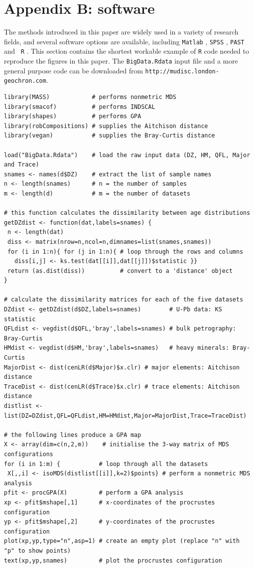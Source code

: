 \documentclass{article}
\begin{document}
\section*{Appendix B: software}

The methods introduced in this paper are widely used in a variety of
research fields, and several software options are available, including
{\tt Matlab} \citep{trendafilov2012}, {\tt SPSS} \citep[{\tt
    PROXSCAL},][]{busing1997}, {\tt PAST} \citep{hammer2008} and {\tt
  R} \citep{deleeuw2011}. This section contains the shortest workable
example of {\tt R} code needed to reproduce the figures in this paper.
The {\tt BigData.Rdata} input file and a more general purpose code can
be downloaded from \verb|http://mudisc.london-geochron.com|.

\begin{verbatim}
library(MASS)            # performs nonmetric MDS
library(smacof)          # performs INDSCAL
library(shapes)          # performs GPA
library(robCompositions) # supplies the Aitchison distance
library(vegan)           # supplies the Bray-Curtis distance

load("BigData.Rdata")    # load the raw input data (DZ, HM, QFL, Major and Trace)
snames <- names(d$DZ)    # extract the list of sample names
n <- length(snames)      # n = the number of samples
m <- length(d)           # m = the number of datasets

# this function calculates the dissimilarity between age distributions
getDZdist <- function(dat,labels=snames) { 
 n <- length(dat)
 diss <- matrix(nrow=n,ncol=n,dimnames=list(snames,snames))
 for (i in 1:n){ for (j in 1:n){ # loop through the rows and columns
   diss[i,j] <- ks.test(dat[[i]],dat[[j]])$statistic }}
 return (as.dist(diss))          # convert to a 'distance' object
}

# calculate the dissimilarity matrices for each of the five datasets
DZdist <- getDZdist(d$DZ,labels=snames)        # U-Pb data: KS statistic
QFLdist <- vegdist(d$QFL,'bray',labels=snames) # bulk petrography: Bray-Curtis
HMdist <- vegdist(d$HM,'bray',labels=snames)   # heavy minerals: Bray-Curtis
MajorDist <- dist(cenLR(d$Major)$x.clr) # major elements: Aitchison distance
TraceDist <- dist(cenLR(d$Trace)$x.clr) # trace elements: Aitchison distance
distlist <- list(DZ=DZdist,QFL=QFLdist,HM=HMdist,Major=MajorDist,Trace=TraceDist)

# the following lines produce a GPA map
X <- array(dim=c(n,2,m))    # initialise the 3-way matrix of MDS configurations
for (i in 1:m) {           # loop through all the datasets
 X[,,i] <- isoMDS(distlist[[i]],k=2)$points} # perform a nonmetric MDS analysis
pfit <- procGPA(X)         # perform a GPA analysis
xp <- pfit$mshape[,1]      # x-coordinates of the procrustes configuration
yp <- pfit$mshape[,2]      # y-coordinates of the procrustes configuration
plot(xp,yp,type="n",asp=1) # create an empty plot (replace "n" with "p" to show points)
text(xp,yp,snames)         # plot the procrustes configuration


\end{verbatim}
\end{document}
